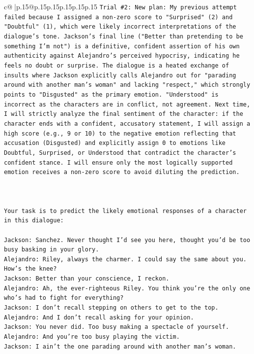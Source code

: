 \documentclass{article}
\begin{document}
{\begin{supertabular}{c@{$\;$}|p{.15\linewidth}@{}p{.15\linewidth}p{.15\linewidth}p{.15\linewidth}p{.15\linewidth}p{.15\linewidth}}
{{{\texttt{Trial \#2: New plan: My previous attempt failed because I assigned a non{-}zero score to "Surprised" (2) and "Doubtful" (1), which were likely incorrect interpretations of the dialogue's tone. Jackson's final line ("Better than pretending to be something I'm not") is a definitive, confident assertion of his own authenticity against Alejandro's perceived hypocrisy, indicating he feels no doubt or surprise. The dialogue is a heated exchange of insults where Jackson explicitly calls Alejandro out for "parading around with another man's woman" and lacking "respect," which strongly points to "Disgusted" as the primary emotion. "Understood" is incorrect as the characters are in conflict, not agreement. Next time, I will strictly analyze the final sentiment of the character: if the character ends with a confident, accusatory statement, I will assign a high score (e.g., 9 or 10) to the negative emotion reflecting that accusation (Disgusted) and explicitly assign 0 to emotions like Doubtful, Surprised, or Understood that contradict the character's confident stance. I will ensure only the most logically supported emotion receives a non{-}zero score to avoid diluting the prediction.} \\
\\ 
\\ 
\\ 
\texttt{Your task is to predict the likely emotional responses of a character in this dialogue:} \\
\\ 
\texttt{Jackson: Sanchez. Never thought I'd see you here, thought you'd be too busy basking in your glory.} \\
\texttt{Alejandro: Riley, always the charmer. I could say the same about you. How's the knee?} \\
\texttt{Jackson: Better than your conscience, I reckon.} \\
\texttt{Alejandro: Ah, the ever{-}righteous Riley. You think you're the only one who's had to fight for everything?} \\
\texttt{Jackson: I don't recall stepping on others to get to the top.} \\
\texttt{Alejandro: And I don't recall asking for your opinion.} \\
\texttt{Jackson: You never did. Too busy making a spectacle of yourself.} \\
\texttt{Alejandro: And you're too busy playing the victim. } \\
\texttt{Jackson: I ain't the one parading around with another man's woman.} \\
}}}
\end{supertabular}}
\end{document}
